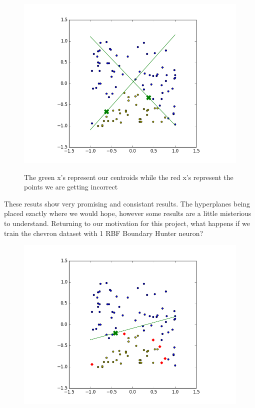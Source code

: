 \documentclass{article}
\theoremstyle{definition}
\begin{document}
\begin{figure}[H]
\begin{minipage}[b]{0.4\textwidth}
    \includegraphics[width=\textwidth]{RBFN-BH-03.png}
    \caption{}
  \end{minipage}
  \hfill

The green x's represent our centroids while the red x's represent the points we are getting incorrect
\end{figure}

These resuts show very promising and consistant results. The hyperplanes being placed ezactly where we would hope, however some results are a little misterious to understand. Returning to our motivation for this project, what happens if we train the chevron dataset with 1 RBF Boundary Hunter neuron?

\begin{figure}[H]
  \centering
  \begin{minipage}[b]{0.4\textwidth}
    \includegraphics[width=\textwidth]{RBFN-BH-04.png}
    \caption{}
  \end{minipage}
  \hfill
\end{figure}
\end{document}

